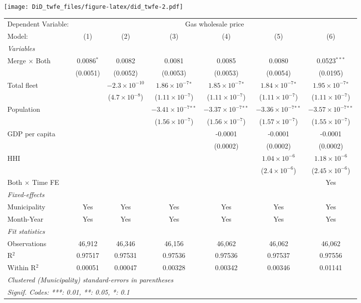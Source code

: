 \documentclass[
]{article}
\begin{document}
\texttt{[image: DiD\_twfe\_files/figure-latex/did\_twfe-2.pdf]}

\begin{tabular}{lcccccc}
\tabularnewline\midrule\midrule
Dependent Variable:&\multicolumn{6}{c}{Gas wholesale price}\\
Model:&(1) & (2) & (3) & (4) & (5) & (6)\\
\midrule \emph{Variables}&   &   &   &   &   &  \\
Merge $\times $ Both & 0.0086$^{*}$ & 0.0082 & 0.0081 & 0.0085 & 0.0080 & 0.0523$^{***}$\\
  &(0.0051) & (0.0052) & (0.0053) & (0.0053) & (0.0054) & (0.0195)\\
Total fleet &    & $-2.3\times 10^{-10}$ & $1.86\times 10^{-7}$$^{*}$ & $1.85\times 10^{-7}$$^{*}$ & $1.84\times 10^{-7}$$^{*}$ & $1.95\times 10^{-7}$$^{*}$\\
  &   & ($4.7\times 10^{-8}$) & ($1.11\times 10^{-7}$) & ($1.11\times 10^{-7}$) & ($1.11\times 10^{-7}$) & ($1.11\times 10^{-7}$)\\
Population &    &    & $-3.41\times 10^{-7}$$^{**}$ & $-3.37\times 10^{-7}$$^{**}$ & $-3.36\times 10^{-7}$$^{**}$ & $-3.57\times 10^{-7}$$^{**}$\\
  &   &    & ($1.56\times 10^{-7}$) & ($1.56\times 10^{-7}$) & ($1.57\times 10^{-7}$) & ($1.55\times 10^{-7}$)\\
GDP per capita &    &    &    & -0.0001 & -0.0001 & -0.0001\\
  &   &    &    & (0.0002) & (0.0002) & (0.0002)\\
HHI &    &    &    &    & $1.04\times 10^{-6}$ & $1.18\times 10^{-6}$\\
  &   &    &    &    & ($2.4\times 10^{-6}$) & ($2.45\times 10^{-6}$)\\
Both $\times$ Time FE &  &  &  &  &  & Yes\\
\midrule \emph{Fixed-effects}&   &   &   &   &   &  \\
Municipality & Yes & Yes & Yes & Yes & Yes & Yes\\
Month-Year & Yes & Yes & Yes & Yes & Yes & Yes\\
\midrule \emph{Fit statistics}&  & & & & & \\
Observations & 46,912&46,346&46,156&46,062&46,062&46,062\\
R$^2$ & 0.97517&0.97531&0.97536&0.97536&0.97537&0.97556\\
Within R$^2$ & 0.00051&0.00047&0.00328&0.00342&0.00346&0.01141\\
\midrule\midrule\multicolumn{7}{l}{\emph{Clustered (Municipality) standard-errors in parentheses}}\\
\multicolumn{7}{l}{\emph{Signif. Codes: ***: 0.01, **: 0.05, *: 0.1}}\\
\end{tabular}
\end{document}
